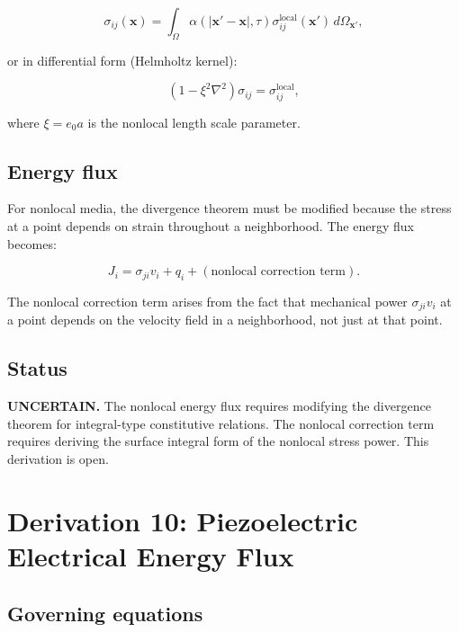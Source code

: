 \documentclass{article}
\begin{document}
\begin{equation}
\sigma_{ij}(\bm{x}) = \int_\Omega \alpha(|\bm{x}' - \bm{x}|, \tau) \sigma_{ij}^{\text{local}}(\bm{x}') \, d\Omega_{\bm{x}'},
\label{ef:nonlocal:1}
\end{equation}

or in differential form (Helmholtz kernel):

\begin{equation}
(1 - \xi^2\nabla^2)\sigma_{ij} = \sigma_{ij}^{\text{local}},
\label{ef:nonlocal:2}
\end{equation}

where $\xi = e_0 a$ is the nonlocal length scale parameter.

\subsection{Energy flux}

For nonlocal media, the divergence theorem must be modified because the stress at a point depends on strain throughout a neighborhood. The energy flux becomes:

\begin{equation}
J_i = \sigma_{ji}v_i + q_i + (\text{nonlocal correction term}).
\label{ef:nonlocal:3}
\end{equation}

The nonlocal correction term arises from the fact that mechanical power $\sigma_{ji}v_i$ at a point depends on the velocity field in a neighborhood, not just at that point.

\subsection{Status}

\textbf{UNCERTAIN.} The nonlocal energy flux requires modifying the divergence theorem for integral-type constitutive relations. The nonlocal correction term requires deriving the surface integral form of the nonlocal stress power. This derivation is open.

\section{Derivation 10: Piezoelectric Electrical Energy Flux}

\subsection{Governing equations}
\end{document}
